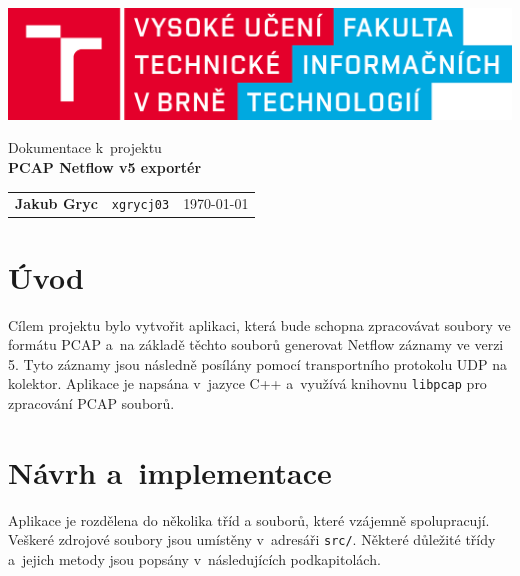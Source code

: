 \documentclass[a4paper, 11pt]{article}
\begin{document}
\begin{sloppypar}
\begin{titlepage}
		\begin{center}
			\includegraphics[width=0.85\linewidth]{./figs/logo_cz.png} \\


			\Huge{Dokumentace k~projektu} \\
			\LARGE{\textbf{PCAP Netflow v5 exportér}} \\
		\end{center}

			\Large

   
            \begin{tabularx}{0.96\textwidth}{ll>{\raggedleft\arraybackslash}X}
                \textbf{Jakub Gryc} & \texttt{xgrycj03} &  \Large\today \\ 
			\end{tabularx}


	\end{titlepage}

\tableofcontents

\newpage
\section{Úvod}

Cílem projektu bylo vytvořit aplikaci, která bude schopna zpracovávat soubory ve formátu PCAP a~na základě těchto souborů generovat Netflow záznamy ve verzi 5. Tyto záznamy jsou následně posílány pomocí transportního protokolu UDP na kolektor. Aplikace je napsána v~jazyce C++ a~využívá knihovnu \texttt{libpcap} pro zpracování PCAP souborů.
\section{Návrh a~implementace}

Aplikace je rozdělena do několika tříd a souborů, které vzájemně spolupracují. Veškeré zdrojové soubory jsou umístěny v~adresáři \texttt{src/}. Některé důležité třídy a~jejich metody jsou popsány v~následujících podkapitolách.

\end{sloppypar}
\end{document}
